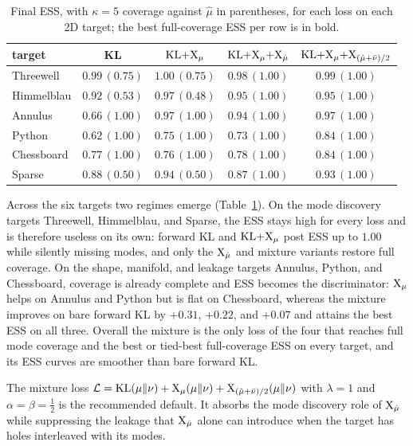 \documentclass{article}
\begin{document}
\begin{table}[h]
    \centering
    \begin{tabular}{@{}lcccc@{}}
        \toprule
        target & KL & $\mathrm{KL}{+}\mathrm{X}_\mu$ & $\mathrm{KL}{+}\mathrm{X}_\mu{+}\mathrm{X}_{\hat\mu}$ & $\mathrm{KL}{+}\mathrm{X}_\mu{+}\mathrm{X}_{(\hat\mu+\bar\nu)/2}$ \\
        \midrule
        Threewell  & $0.99\,(0.75)$ & $1.00\,(0.75)$ & $0.98\,(1.00)$ & $\mathbf{0.99}\,(1.00)$ \\
        Himmelblau & $0.92\,(0.53)$ & $0.97\,(0.48)$ & $\mathbf{0.95}\,(1.00)$ & $\mathbf{0.95}\,(1.00)$ \\
        Annulus    & $0.66\,(1.00)$ & $\mathbf{0.97}\,(1.00)$ & $0.94\,(1.00)$ & $\mathbf{0.97}\,(1.00)$ \\
        Python     & $0.62\,(1.00)$ & $0.75\,(1.00)$ & $0.73\,(1.00)$ & $\mathbf{0.84}\,(1.00)$ \\
        Chessboard & $0.77\,(1.00)$ & $0.76\,(1.00)$ & $0.78\,(1.00)$ & $\mathbf{0.84}\,(1.00)$ \\
        Sparse     & $0.88\,(0.50)$ & $0.94\,(0.50)$ & $0.87\,(1.00)$ & $\mathbf{0.93}\,(1.00)$ \\
        \bottomrule
    \end{tabular}
    \caption{Final ESS, with $\kappa=5$ coverage against $\hat\mu$ in parentheses, for each loss on each 2D target; the best full-coverage ESS per row is in bold.}
    \label{tab: 2d-benchmark-summary}
\end{table}

Across the six targets two regimes emerge (Table~\ref{tab: 2d-benchmark-summary}). On the mode discovery targets Threewell, Himmelblau, and Sparse, the ESS stays high for every loss and is therefore useless on its own: forward KL and $\mathrm{KL}{+}\mathrm{X}_\mu$ post ESS up to $1.00$ while silently missing modes, and only the $\mathrm{X}_{\hat\mu}$ and mixture variants restore full coverage. On the shape, manifold, and leakage targets Annulus, Python, and Chessboard, coverage is already complete and ESS becomes the discriminator: $\mathrm{X}_\mu$ helps on Annulus and Python but is flat on Chessboard, whereas the mixture improves on bare forward KL by $+0.31$, $+0.22$, and $+0.07$ and attains the best ESS on all three. Overall the mixture is the only loss of the four that reaches full mode coverage and the best or tied-best full-coverage ESS on every target, and its ESS curves are smoother than bare forward KL.

The mixture loss $\mathcal L = \mathrm{KL}(\mu \| \nu) + \mathrm{X}_\mu(\mu\|\nu) + \mathrm{X}_{(\hat\mu + \bar\nu)/2}(\mu\|\nu)$ with $\lambda = 1$ and $\alpha = \beta = \frac12$ is the recommended default. It absorbs the mode discovery role of $\mathrm{X}_{\hat\mu}$ while suppressing the leakage that $\mathrm{X}_{\hat\mu}$ alone can introduce when the target has holes interleaved with its modes.
\end{document}
